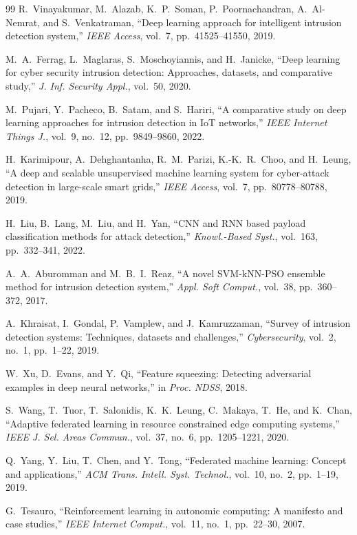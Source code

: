 \begin{thebibliography}{99}
R.~Vinayakumar, M.~Alazab, K.~P.~Soman, P.~Poornachandran, A.~Al-Nemrat, and S.~Venkatraman, ``Deep learning approach for intelligent intrusion detection system,'' \emph{IEEE Access}, vol.~7, pp.~41525--41550, 2019.

M.~A.~Ferrag, L.~Maglaras, S.~Moschoyiannis, and H.~Janicke, ``Deep learning for cyber security intrusion detection: Approaches, datasets, and comparative study,'' \emph{J. Inf. Security Appl.}, vol.~50, 2020.

M.~Pujari, Y.~Pacheco, B.~Satam, and S.~Hariri, ``A comparative study on deep learning approaches for intrusion detection in IoT networks,'' \emph{IEEE Internet Things J.}, vol.~9, no.~12, pp.~9849--9860, 2022.

H.~Karimipour, A.~Dehghantanha, R.~M.~Parizi, K.-K.~R.~Choo, and H.~Leung, ``A deep and scalable unsupervised machine learning system for cyber-attack detection in large-scale smart grids,'' \emph{IEEE Access}, vol.~7, pp.~80778--80788, 2019.

H.~Liu, B.~Lang, M.~Liu, and H.~Yan, ``CNN and RNN based payload classification methods for attack detection,'' \emph{Knowl.-Based Syst.}, vol.~163, pp.~332--341, 2022.

A.~A.~Aburomman and M.~B.~I.~Reaz, ``A novel SVM-kNN-PSO ensemble method for intrusion detection system,'' \emph{Appl. Soft Comput.}, vol.~38, pp.~360--372, 2017.

A.~Khraisat, I.~Gondal, P.~Vamplew, and J.~Kamruzzaman, ``Survey of intrusion detection systems: Techniques, datasets and challenges,'' \emph{Cybersecurity}, vol.~2, no.~1, pp.~1--22, 2019.

W.~Xu, D.~Evans, and Y.~Qi, ``Feature squeezing: Detecting adversarial examples in deep neural networks,'' in \emph{Proc. NDSS}, 2018.

S.~Wang, T.~Tuor, T.~Salonidis, K.~K.~Leung, C.~Makaya, T.~He, and K.~Chan, ``Adaptive federated learning in resource constrained edge computing systems,'' \emph{IEEE J. Sel. Areas Commun.}, vol.~37, no.~6, pp.~1205--1221, 2020.

Q.~Yang, Y.~Liu, T.~Chen, and Y.~Tong, ``Federated machine learning: Concept and applications,'' \emph{ACM Trans. Intell. Syst. Technol.}, vol.~10, no.~2, pp.~1--19, 2019.

G.~Tesauro, ``Reinforcement learning in autonomic computing: A manifesto and case studies,'' \emph{IEEE Internet Comput.}, vol.~11, no.~1, pp.~22--30, 2007.

\end{thebibliography}



